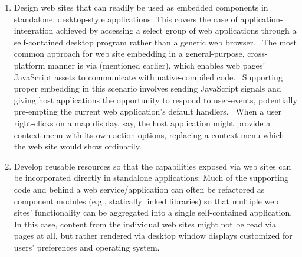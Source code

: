 \documentclass[10.5pt]{article}
\begin{document}
{{\begin{enumerate}[leftmargin=3pt, itemsep=-1pt]
\item{} Design web sites that can readily be used as embedded components in standalone, desktop-style applications: This covers the case of application-integration achieved by accessing a select group of web applications through a self-contained desktop program rather than a generic web browser.  The most common approach for web site embedding in a general-purpose, cross-platform manner is via  (mentioned earlier), which enables web pages' JavaScript assets to communicate with native-compiled code.  Supporting proper embedding in this scenario involves sending JavaScript signals and giving host applications the opportunity to respond to user-events, potentially pre-empting the current web application's default handlers.  When a user right-clicks on a map display, say, the host application might provide a context menu with its own action options, replacing a context menu which the web site would show ordinarily.

\item{} Develop reusable resources so that the capabilities exposed via web sites can be incorporated directly in standalone applications: Much of the supporting code and  behind a web service/application can often be refactored as component modules (e.g., statically linked libraries) so that multiple web sites' functionality can be aggregated into a single self-contained application.  In this case, content from the individual web sites might not be read via \HTML{} pages at all, but rather rendered via desktop window displays customized for users' preferences and operating system.

\end{enumerate}
}

}
\end{document}
